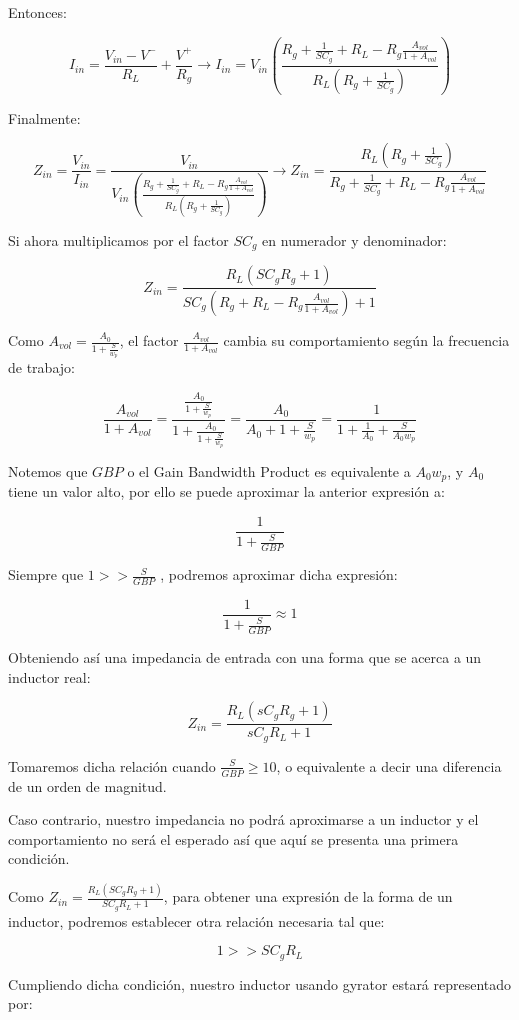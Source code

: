 Entonces:

$$I_{in}=\frac{V_{in}-V^-}{R_L}+\frac{V^+}{R_g} \longrightarrow 
I_{in}=V_{in}(\frac{R_g+\frac{1}{SC_g}+R_L-R_g\frac{A_{vol}}{1+A_{vol}}}{R_L(R_g+\frac{1}{SC_g})})$$

Finalmente:

$$Z_{in}=\frac{V_{in}}{I_{in}}=\frac{V_{in}}{V_{in}(\frac{R_g+\frac{1}{SC_g}+R_L-R_g\frac{A_{vol}}{1+A_{vol}}}{R_L(R_g+\frac{1}{SC_g})})} \longrightarrow
Z_{in}=\frac{R_L(R_g+\frac{1}{SC_g})}{R_g+\frac{1}{SC_g}+R_L-R_g\frac{A_{vol}}{1+A_{vol}}}$$

Si ahora multiplicamos por el factor $SC_g$ en numerador y denominador:

$$Z_{in}=\frac{R_L(SC_gR_g+1)}{SC_g(R_g+R_L-R_g\frac{A_{vol}}{1+A_{vol}})+1}$$

Como $A_{vol}=\frac{A_0}{1+\frac{S}{w_p}}$, el factor $\frac{A_{vol}}{1+A_{vol}}$ cambia su comportamiento
según la frecuencia de trabajo:

$$\frac{A_{vol}}{1+A_{vol}}=\frac{\frac{A_0}{1+\frac{S}{w_p}}}{1+\frac{A_0}{1+\frac{S}{w_p}}}=
\frac{A_0}{A_0+1+\frac{S}{w_p}}=\frac{1}{1+\frac{1}{A_0}+\frac{S}{A_0w_p}}$$

Notemos que $GBP$ o el Gain Bandwidth Product es equivalente a $A_0w_p$, y $A_0$ tiene un valor alto, por ello se puede aproximar la anterior
expresión a:

$$\frac{1}{1+\frac{S}{GBP}}$$

Siempre que $1 >> \frac{S}{GBP}$ , podremos aproximar dicha expresión:

$$\frac{1}{1+\frac{S}{GBP}} \approx 1$$

Obteniendo así una impedancia de entrada con una forma que se acerca a un inductor real:

$$Z_{in}=\frac{R_L(sC_gR_g+1)}{sC_gR_L+1}$$

Tomaremos dicha relación cuando $\frac{S}{GBP} \geq 10$, o equivalente a decir una diferencia de un orden de magnitud.

Caso contrario, nuestro impedancia no podrá aproximarse a un inductor y el comportamiento no será el esperado así que aquí se presenta 
una primera condición.

Como $Z_{in}=\frac{R_L(SC_gR_g+1)}{SC_gR_L+1}$, para obtener una expresión de la forma de un inductor,
podremos establecer otra relación necesaria tal que:

$$1 >> SC_gR_L$$

Cumpliendo dicha condición, nuestro inductor usando gyrator estará representado por:

